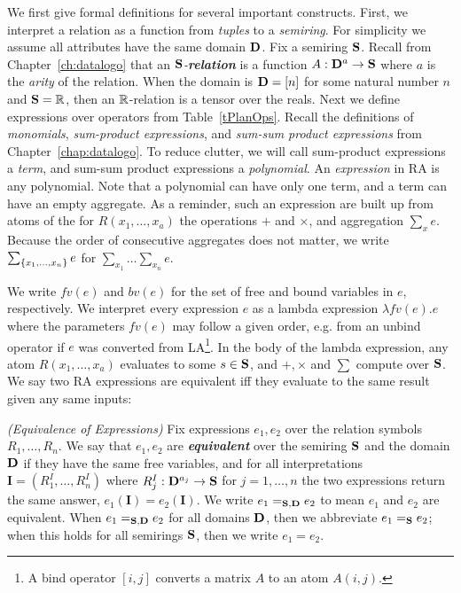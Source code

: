 
We first give formal definitions for several important constructs. First, we interpret a relation as a function from {\em tuples} to a {\em semiring}. For simplicity we assume all attributes have the same domain $\mathbf D$. 
Fix a semiring $\mathbf S$.  
Recall from Chapter~\ref{ch:datalogo} that
an {\em $\mathbf S$-\textbf{relation}} is a function $A: \mathbf D^a \rightarrow \mathbf S$ where $a$ is the {\em arity} of the relation.
When the domain is $\mathbf D = [n]$ for some natural number $n$ and $\mathbf S=\mathbb R$, then an $\mathbb R$-relation is a tensor over the reals.  
Next we define expressions over operators from Table~\ref{tPlanOps}. 
Recall the definitions of {\em monomials}, {\em sum-product expressions},
 and {\em sum-sum product expressions} from Chapter~\ref{chap:datalogo}.
To reduce clutter, we will call sum-product expressions a {\em term}, 
 and sum-sum product expressions a {\em polynomial}. 
An {\em expression} in RA is any polynomial.
Note that a polynomial can have only one term, and a term can have an empty aggregate. 
As a reminder, such an expression are built up from atoms of the for $R(x_1, \ldots, x_a)$ 
 the operations $+$ and $\times$, and aggregation $\sum_x e$.
Because the order of consecutive aggregates does not matter, we write $\sum_{\{x_1, \dots, x_n\}} e$ for $\sum_{x_1} \dots \sum_{x_n} e$. 

We write $fv(e)$ and $bv(e)$ for the set of free and bound variables in $e$, respectively.
We interpret every expression $e$ as a lambda expression $\lambda fv(e) . e$ where the parameters $fv(e)$ may follow a given order, e.g. from an unbind operator if $e$ was converted from LA\footnote{A bind operator $[i,j]$ converts a matrix $A$ to an atom $A(i,j)$.}.
 In the body of the lambda expression, any atom $R(x_1, \dots , x_a)$ evaluates to some $s \in \mathbf S$, and $+, \times$ and $\sum$ compute over $\mathbf S$. We say two RA expressions are equivalent iff they evaluate to the same result given any same inputs: 

\begin{defn}{\em (Equivalence of Expressions)} Fix  expressions $e_1, e_2$ over the relation symbols $R_1, \ldots, R_n$.  We say that $e_1, e_2$ are {\em \textbf{equivalent}} over the semiring $\mathbf S$ and the domain $\mathbf D$ if they have the same free variables, and for all interpretations $\pmb{I} = (R_1^I, \ldots, R_n^I)$ where $R_j^I : \mathbf D^{a_j} \rightarrow \mathbf S$ for $j=1, \ldots, n$ the two expressions return the same answer, $e_1(\pmb{I}) = e_2(\pmb{I})$.  We write $e_1 =_{\mathbf S, \mathbf D} e_2$ to mean $e_1$ and $e_2$ are equivalent.  When $e_1 =_{\mathbf S, \mathbf D} e_2$ for all domains $\mathbf D$, then we abbreviate $e_1 =_\mathbf S e_2$; when this holds for all semirings $\mathbf S$, then we write $e_1 = e_2$.
\end{defn}{}


